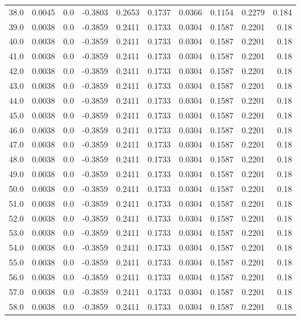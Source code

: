 \begin{longtable}{lrrrrrrrrr}
38.0 & 0.0045 & 0.0 & -0.3803 & 0.2653 & 0.1737 & 0.0366 & 0.1154 & 0.2279 & 0.184 \\
39.0 & 0.0038 & 0.0 & -0.3859 & 0.2411 & 0.1733 & 0.0304 & 0.1587 & 0.2201 & 0.18 \\
40.0 & 0.0038 & 0.0 & -0.3859 & 0.2411 & 0.1733 & 0.0304 & 0.1587 & 0.2201 & 0.18 \\
41.0 & 0.0038 & 0.0 & -0.3859 & 0.2411 & 0.1733 & 0.0304 & 0.1587 & 0.2201 & 0.18 \\
42.0 & 0.0038 & 0.0 & -0.3859 & 0.2411 & 0.1733 & 0.0304 & 0.1587 & 0.2201 & 0.18 \\
43.0 & 0.0038 & 0.0 & -0.3859 & 0.2411 & 0.1733 & 0.0304 & 0.1587 & 0.2201 & 0.18 \\
44.0 & 0.0038 & 0.0 & -0.3859 & 0.2411 & 0.1733 & 0.0304 & 0.1587 & 0.2201 & 0.18 \\
45.0 & 0.0038 & 0.0 & -0.3859 & 0.2411 & 0.1733 & 0.0304 & 0.1587 & 0.2201 & 0.18 \\
46.0 & 0.0038 & 0.0 & -0.3859 & 0.2411 & 0.1733 & 0.0304 & 0.1587 & 0.2201 & 0.18 \\
47.0 & 0.0038 & 0.0 & -0.3859 & 0.2411 & 0.1733 & 0.0304 & 0.1587 & 0.2201 & 0.18 \\
48.0 & 0.0038 & 0.0 & -0.3859 & 0.2411 & 0.1733 & 0.0304 & 0.1587 & 0.2201 & 0.18 \\
49.0 & 0.0038 & 0.0 & -0.3859 & 0.2411 & 0.1733 & 0.0304 & 0.1587 & 0.2201 & 0.18 \\
50.0 & 0.0038 & 0.0 & -0.3859 & 0.2411 & 0.1733 & 0.0304 & 0.1587 & 0.2201 & 0.18 \\
51.0 & 0.0038 & 0.0 & -0.3859 & 0.2411 & 0.1733 & 0.0304 & 0.1587 & 0.2201 & 0.18 \\
52.0 & 0.0038 & 0.0 & -0.3859 & 0.2411 & 0.1733 & 0.0304 & 0.1587 & 0.2201 & 0.18 \\
53.0 & 0.0038 & 0.0 & -0.3859 & 0.2411 & 0.1733 & 0.0304 & 0.1587 & 0.2201 & 0.18 \\
54.0 & 0.0038 & 0.0 & -0.3859 & 0.2411 & 0.1733 & 0.0304 & 0.1587 & 0.2201 & 0.18 \\
55.0 & 0.0038 & 0.0 & -0.3859 & 0.2411 & 0.1733 & 0.0304 & 0.1587 & 0.2201 & 0.18 \\
56.0 & 0.0038 & 0.0 & -0.3859 & 0.2411 & 0.1733 & 0.0304 & 0.1587 & 0.2201 & 0.18 \\
57.0 & 0.0038 & 0.0 & -0.3859 & 0.2411 & 0.1733 & 0.0304 & 0.1587 & 0.2201 & 0.18 \\
58.0 & 0.0038 & 0.0 & -0.3859 & 0.2411 & 0.1733 & 0.0304 & 0.1587 & 0.2201 & 0.18 \\

\end{longtable}
